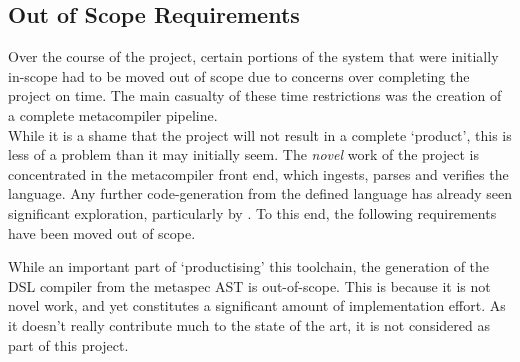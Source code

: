 

\subsection{Out of Scope Requirements} %
\label{sub:out_of_scope_requirements}
Over the course of the project, certain portions of the system that were initially in-scope had to be moved out of scope due to concerns over completing the project on time.
The main casualty of these time restrictions was the creation of a complete metacompiler pipeline.\\

While it is a shame that the project will not result in a complete `product', this is less of a problem than it may initially seem.
The \textit{novel} work of the project is concentrated in the metacompiler front end, which ingests, parses and verifies the language. 
Any further code-generation from the defined language has already seen significant exploration, particularly by \citet{diehl1996semantics}.
To this end, the following requirements have been moved out of scope.\\


While an important part of `productising' this toolchain, the generation of the DSL compiler from the metaspec AST is out-of-scope.
This is because it is not novel work, and yet constitutes a significant amount of implementation effort. 
As it doesn't really contribute much to the state of the art, it is not considered as part of this project.\\


